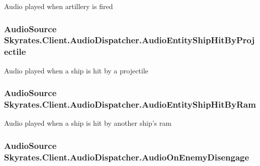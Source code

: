 Audio played when artillery is fired 

\hypertarget{class_skyrates_1_1_client_1_1_audio_dispatcher_a3bcd016090038e5f09c8735ad5cba131}{
\subsubsection[{Audio\-Entity\-Ship\-Hit\-By\-Projectile}]{\setlength{\rightskip}{0pt plus 5cm}Audio\-Source Skyrates.\-Client.\-Audio\-Dispatcher.\-Audio\-Entity\-Ship\-Hit\-By\-Projectile}}\label{class_skyrates_1_1_client_1_1_audio_dispatcher_a3bcd016090038e5f09c8735ad5cba131}


Audio played when a ship is hit by a projectile 

\hypertarget{class_skyrates_1_1_client_1_1_audio_dispatcher_a67abfa1ba1df41fd20457865b10b9a4a}{
\subsubsection[{Audio\-Entity\-Ship\-Hit\-By\-Ram}]{\setlength{\rightskip}{0pt plus 5cm}Audio\-Source Skyrates.\-Client.\-Audio\-Dispatcher.\-Audio\-Entity\-Ship\-Hit\-By\-Ram}}\label{class_skyrates_1_1_client_1_1_audio_dispatcher_a67abfa1ba1df41fd20457865b10b9a4a}


Audio played when a ship is hit by another ship's ram 

\hypertarget{class_skyrates_1_1_client_1_1_audio_dispatcher_a12f9d81e7271cf0dae71482611df8e03}{
\subsubsection[{Audio\-On\-Enemy\-Disengage}]{\setlength{\rightskip}{0pt plus 5cm}Audio\-Source Skyrates.\-Client.\-Audio\-Dispatcher.\-Audio\-On\-Enemy\-Disengage}}\label{class_skyrates_1_1_client_1_1_audio_dispatcher_a12f9d81e7271cf0dae71482611df8e03}


